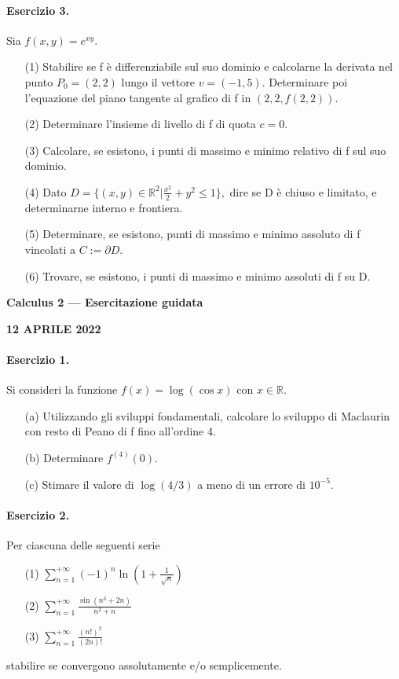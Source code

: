 \documentclass[a4paper, 10pt]{article}
\newcommand{\sectiontitle}[1]{\begin{center}\large\bfseries #1\end{center}}
\newcommand{\exercisecenter}[1]{\begin{center}\bfseries #1\end{center}}
\begin{document}
\paragraph{Esercizio 3.} Sia $f(x,y)=e^{xy}$.
\begin{enumerate}
    \item[(1)] Stabilire se f è differenziabile sul suo dominio e calcolarne la derivata nel punto $P_{0}=(2,2)$ lungo il vettore $v=(-1,5).$ Determinare poi l'equazione del piano tangente al grafico di f in $(2,2,f(2,2))$.
    \item[(2)] Determinare l'insieme di livello di f di quota $c=0$.
    \item[(3)] Calcolare, se esistono, i punti di massimo e minimo relativo di f sul suo dominio.
    \item[(4)] Dato $D=\{(x,y)\in\mathbb{R}^{2}|\frac{x^{2}}{2}+y^{2}\le1\},$ dire se D è chiuso e limitato, e determinarne interno e frontiera.
    \item[(5)] Determinare, se esistono, punti di massimo e minimo assoluto di f vincolati a $C:=\partial D$.
    \item[(6)] Trovare, se esistono, i punti di massimo e minimo assoluti di f su D.
\end{enumerate}

\newpage

\sectiontitle{Calculus 2 --- Esercitazione guidata}
\exercisecenter{12 APRILE 2022}

\paragraph{Esercizio 1.} Si consideri la funzione $f(x)=\log(\cos x)$ con $x\in\mathbb{R}.$
\begin{enumerate}
    \item[(a)] Utilizzando gli sviluppi fondamentali, calcolare lo sviluppo di Maclaurin con resto di Peano di f fino all'ordine 4.
    \item[(b)] Determinare $f^{(4)}(0)$.
    \item[(c)] Stimare il valore di $\log(4/3)$ a meno di un errore di $10^{-5}$.
\end{enumerate}

\paragraph{Esercizio 2.} Per ciascuna delle seguenti serie
\begin{enumerate}
    \item[(1)] $\displaystyle \sum_{n=1}^{+\infty}(-1)^{n}\ln\left(1+\frac{1}{\sqrt{n}}\right)$
    \item[(2)] $\displaystyle \sum_{n=1}^{+\infty}\frac{\sin(n^{3}+2n)}{n^{2}+n}$
    \item[(3)] $\displaystyle \sum_{n=1}^{+\infty}\frac{(n!)^{2}}{(2n)!}$
\end{enumerate}
stabilire se convergono assolutamente e/o semplicemente.
\end{document}
